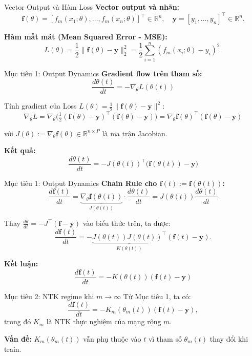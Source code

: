 \begin{frame}{Vector Output và Hàm Loss}
  \textbf{Vector output và nhãn:}
  \[
    \mathbf{f}(\theta) = [f_m(x_1;\theta), \dots, f_m(x_n;\theta)]^\top \in \mathbb{R}^n,
    \quad
    \mathbf{y} = [y_1, \dots, y_n]^\top \in \mathbb{R}^n.
  \]

  \textbf{Hàm mất mát (Mean Squared Error - MSE):}
  \[
    L(\theta) = \frac{1}{2} \|\mathbf{f}(\theta) - \mathbf{y}\|^2_2
              = \frac{1}{2} \sum_{i=1}^n (f_m(x_i;\theta) - y_i)^2.
  \]
\end{frame}

\begin{frame}{Mục tiêu 1: Output Dynamics}
  \textbf{Gradient flow trên tham số:}
  \[
    \frac{d\theta(t)}{dt} = -\nabla_\theta L(\theta(t))
  \]
  
  Tính gradient của Loss $L(\theta) = \frac{1}{2}\|\mathbf{f}(\theta) - \mathbf{y}\|^2$:
  \[
    \nabla_\theta L
    = \nabla_\theta \Big( \tfrac{1}{2}(\mathbf{f}(\theta) - \mathbf{y})^\top (\mathbf{f}(\theta) - \mathbf{y}) \Big)
    = \nabla_\theta \mathbf{f}(\theta)^\top (\mathbf{f}(\theta) - \mathbf{y})
  \]

  với $J(\theta) := \nabla_\theta \mathbf{f}(\theta) \in \mathbb{R}^{n \times P}$ là ma trận Jacobian.

  \vspace{0.3cm}
  \textbf{Kết quả:}
  \[
    \frac{d\theta(t)}{dt} = -J(\theta(t))^\top \big(\mathbf{f}(\theta(t)) - \mathbf{y}\big)
  \]
\end{frame}

\begin{frame}{Mục tiêu 1: Output Dynamics}
  \textbf{Chain Rule cho $\mathbf{f}(t) := \mathbf{f}(\theta(t))$:}
  \[
    \frac{d\mathbf{f}(t)}{dt}
    = \underbrace{\nabla_\theta \mathbf{f}(\theta(t))}_{J(\theta(t))} \cdot \frac{d\theta(t)}{dt}
    = J(\theta(t)) \frac{d\theta(t)}{dt}
  \]

  Thay $\displaystyle \frac{d\theta}{dt} = -J^\top (\mathbf{f} - \mathbf{y})$ vào biểu thức trên, ta được:
  \[
    \frac{d\mathbf{f}(t)}{dt} = - \underbrace{J(\theta(t)) J(\theta(t))^\top}_{K(\theta(t))}(\mathbf{f}(t) - \mathbf{y}).
  \]

  \textbf{Kết luận:} 
  \[
    \frac{d\mathbf{f}(t)}{dt} = -K(\theta(t))(\mathbf{f}(t) - \mathbf{y})
  \]
\end{frame}

\begin{frame}{Mục tiêu 2: NTK regime khi $m \to \infty$}
  Từ Mục tiêu 1, ta có:
  \[
    \frac{d\mathbf f(t)}{dt}
    = -K_m(\theta_m(t))(\mathbf f(t) - \mathbf y),
  \]
  trong đó $K_m$ là NTK thực nghiệm của mạng rộng $m$.

  \vspace{0.2cm}
  \textbf{Vấn đề:} $K_m(\theta_m(t))$ vẫn phụ thuộc vào $t$
  vì tham số $\theta_m(t)$ thay đổi khi train.
\end{frame}

